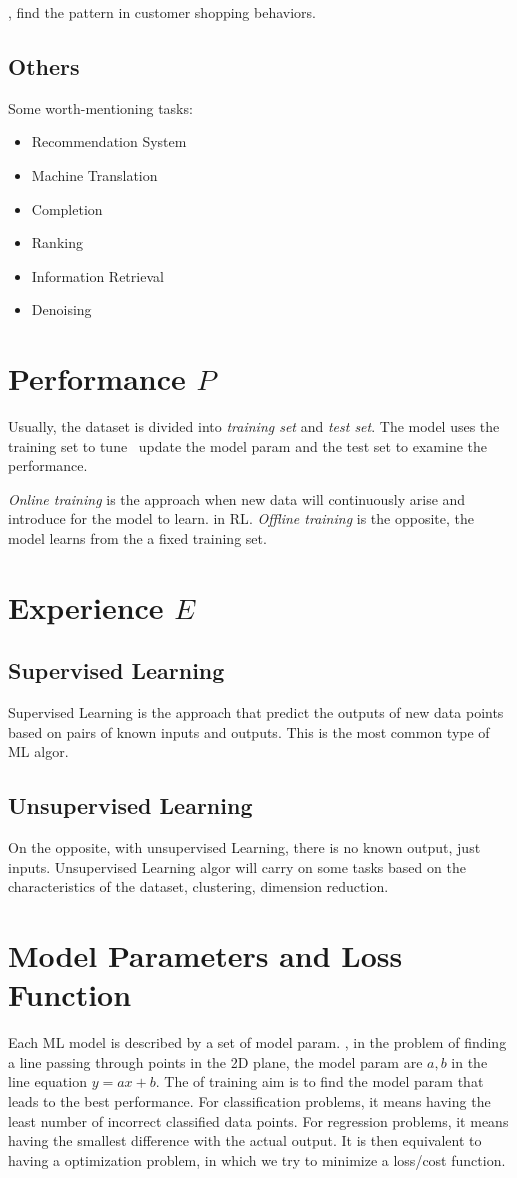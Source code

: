 \Eg, find the pattern in customer shopping behaviors.

\subsection{Others}
Some worth-mentioning tasks:
\begin{itemize}
	\item Recommendation System
	\item Machine Translation
	\item Completion
	\item Ranking
	\item Information Retrieval
	\item Denoising
\end{itemize}

\section{Performance $P$}
Usually, the dataset is divided into \textit{training set} and \textit{test set}. The model uses the training set to tune \ update the model \ac{param} and the test set to examine the performance.

\textit{Online training} is the approach when new data will continuously arise and introduce for the model to learn. \Eg in \ac{RL}. \textit{Offline training} is the opposite, the model learns from the a fixed training set.

\section{Experience $E$}
\subsection{Supervised Learning}
Supervised Learning is the approach that predict the outputs of new data points based on pairs of known inputs and outputs. This is the most common type of \ac{ML} \ac{algor}.
\subsection{Unsupervised Learning}
On the opposite, with unsupervised Learning, there is no known output, just inputs. Unsupervised Learning \ac{algor} will carry on some tasks based on the characteristics of the dataset, \eg clustering, dimension reduction.

\section{Model Parameters and Loss Function}
\label{sec:model-param-loss}
Each \ac{ML} model is described by a set of model \ac{param}. \Eg, in the problem of finding a line passing through points in the 2D plane, the model \ac{param} are $a, b$ in the line equation $y=ax+b$. The of training aim is to find the model \ac{param} that leads to the best performance. For classification problems, it means having the least number of incorrect classified data points. For regression problems, it means having the smallest difference with the actual output. It is then equivalent to having a optimization problem, in which we try to minimize a loss/cost function.